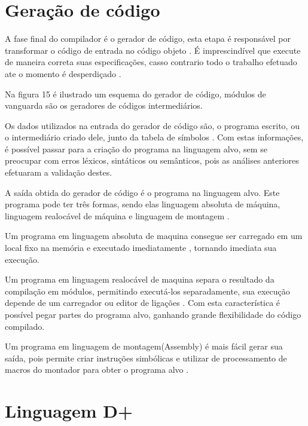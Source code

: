 \documentclass[12pt,oneside,a4paper,chapter=TITLE,section=TITLE,sumario=tradicional]{abntex2}
\begin{document}
\section{Geração de código}
\label{sec:geracao-de-codigo}

A fase final do compilador é o gerador de código, esta etapa é responsável por transformar o código de entrada no código objeto \cite{alfred1995}. É imprescindível que execute de maneira correta suas especificações, casso contrario todo o trabalho efetuado ate o momento é desperdiçado \cite{alfred1995}.

Na figura 15 é ilustrado um esquema do gerador de código, módulos de vanguarda são os geradores de códigos intermediários.

\begin{figure}[htb]
\end{figure}

Os dados utilizados na entrada do gerador de código são, o programa escrito, ou o intermediário criado dele, junto da tabela de símbolos \cite{alfred1995}. Com estas informações, é possível passar para a criação do programa na linguagem alvo, sem se preocupar com erros léxicos, sintáticos ou semânticos, pois as análises anteriores efetuaram a validação destes.

A saída obtida do gerador de código é o programa na linguagem alvo. Este programa pode ter três formas, sendo elas linguagem absoluta de máquina, linguagem realocável de máquina e linguagem de montagem \cite{alfred1995}.

Um programa em linguagem absoluta de maquina consegue ser carregado em um local fixo na memória e executado imediatamente \cite{alfred1995}, tornando imediata sua execução.

Um programa em linguagem realocável de maquina separa o resultado da compilação em módulos, permitindo executá-los separadamente, sua execução depende de um carregador ou editor de ligações \cite{alfred1995}. Com esta característica é possível pegar partes do programa alvo, ganhando grande flexibilidade do código compilado.

Um programa em linguagem de montagem(Assembly) é mais fácil gerar sua saída, pois permite criar instruções simbólicas e utilizar de processamento de macros do montador para obter o programa alvo \cite{alfred1995}.

\section{Linguagem D+}
\label{sec:linguagem-d+}
\end{document}
